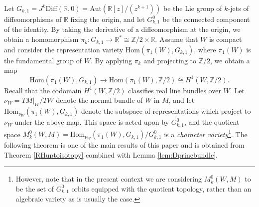 \documentclass[10pt]{amsart}
\numberwithin{theoremalpha}{section}
\numberwithin{equation}{section}
\numberwithin{definition}{section}
\numberwithin{theorem}{section}
\numberwithin{proposition}{section}
\numberwithin{lemma}{section}
\numberwithin{example}{section}
\numberwithin{remark}{section}
\numberwithin{corollary}{section}
\numberwithin{question}{section}
\numberwithin{problem}{section}
\numberwithin{assumption}{section}
\theoremstyle{named}
\numberwithin{equation}{section}
\begin{document}
Let $G_{k,1} = J^{k}\mathrm{Diff}(\mathbb{R}, 0) = \mathrm{Aut}(\mathbb{R}[z]/(z^{k+1}))$ be the Lie group of $k$-jets of diffeomorphisms of $\mathbb{R}$ fixing the origin, and let $G_{k,1}^{0}$ be the connected component of the identity. By taking the derivative of a diffeomorphism at the origin, we obtain a homomorphism $\pi_{k}: G_{k,1} \to \mathbb{R}^* \cong \mathbb{Z}/2 \times \mathbb{R}$. Assume that $W$ is compact and consider the representation variety $\mathrm{Hom}(\pi_1(W), G_{k,1})$, where $\pi_1(W)$ is the fundamental group of $W$. By applying $\pi_{k}$ and projecting to $\mathbb{Z}/2$, we obtain a map 
\[
\mathrm{Hom}(\pi_1(W), G_{k,1}) \to \mathrm{Hom}(\pi_1(W), \mathbb{Z}/2) \cong H^{1}(W, \mathbb{Z}/2). 
\]
Recall that the codomain $H^{1}(W, \mathbb{Z}/2)$ classifies real line bundles over $W$. Let $\nu_W = TM|_{W}/TW$ denote the normal bundle of $W$ in $M$, and let $\mathrm{Hom}_{\nu_W}(\pi_1(W), G_{k,1})$ denote the subspace of representations which project to $\nu_W$ under the above map. This space is acted upon by $G_{k,1}^{0}$, and the quotient space $M^0_{k}(W,M) = \mathrm{Hom}_{\nu_W}(\pi_{1}(W), G_{k,1})/G_{k,1}^0$ is a \emph{character variety}\footnote{However, note that in the present context we are considering $M^0_{k}(W,M)$ to be the set of $G_{k,1}^{0}$ orbits equipped with the quotient topology, rather than an algebraic variety as is usually the case.}. The following theorem is one of the main results of this paper and is obtained from Theorem \ref{RHuptoisotopy} combined with Lemma \ref{lem:Dprincbundle}. 
\end{document}
